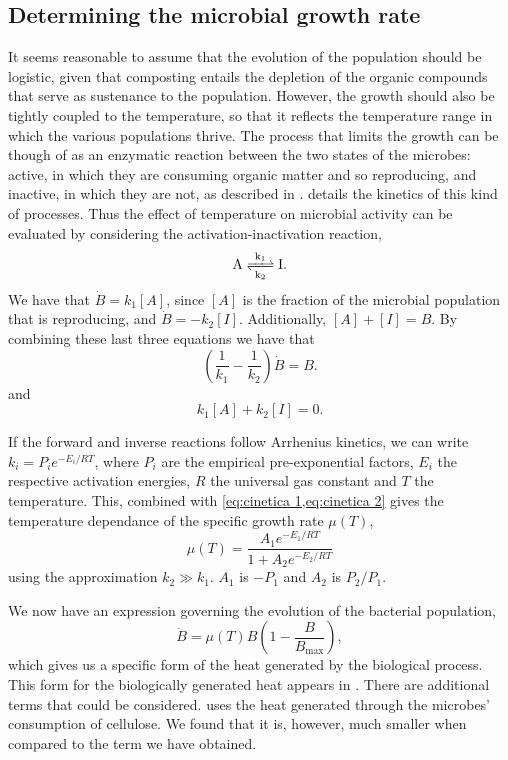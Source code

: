 \documentclass[12pt, a4paper, twocolumn, twoside]{article}
\numberwithin{table}{section}
\numberwithin{figure}{section}
\numberwithin{equation}{section}
\begin{document}
\subsection{Determining the microbial growth rate}
It seems reasonable to assume that the evolution of the population should be logistic, given that composting entails the depletion of the organic compounds that serve as sustenance to the population. However, the growth should also be tightly coupled to the temperature, so that it reflects the temperature range in which the various populations thrive. The process that limits the growth can be though of as an enzymatic reaction between the two states of the microbes: active, in which they are consuming organic matter and so reproducing, and inactive, in which they are not, as described in \cite{85bio}. \cite{biokinetics} details the kinetics of this kind of processes. Thus the effect of temperature on microbial activity can be evaluated by considering the activation-inactivation reaction,
\begin{equation*}
    \ce{A <=>[\ce{k1}][\ce{k2}] I}. 
\end{equation*}
We have that $\dot{B}=k_1[A]$, since \( [A] \) is the fraction of the microbial population that is reproducing, and $\dot{B}= -k_2[I]$. Additionally, \( [A] + [I] = B \).  By combining these last three equations we have that
\begin{equation} \label{eq:cinetica 1}
	\left(\frac{1}{k_1}-\frac{1}{k_2}\right)\dot{B}=B.
\end{equation}
and 
\begin{equation} \label{eq:cinetica 2}
	k_1[A]+k_2[I]=0.
\end{equation}

If the forward and inverse reactions follow Arrhenius kinetics, we can write $k_i=P_ie^{-E_i/RT}$, where $P_i$ are the empirical pre-exponential factors, $E_i$ the respective activation energies, $R$ the universal gas constant and $T$ the temperature. This, combined with \cref{eq:cinetica 1,eq:cinetica 2} gives the temperature dependance of the specific growth rate \( \mu(T) \), 
\begin{equation} \label{eq:mumax}
    \mu(T)=\frac{A_1e^{-E_1/RT}}{1+A_2e^{-E_2/RT}}
\end{equation}
using the approximation $k_2\gg k_1$. \( A_1 \) is \( -P_1 \) and \( A_2 \) is \( P_2/P_1 \).

We now have an expression governing the evolution of the bacterial population,
\begin{equation}\label{eq:edo B}
	\dot{B} = \mu(T)B\left(1 - \frac{B}{B_\text{max}}\right),
\end{equation}
which gives us a specific form of the heat generated by the biological process. This form for the biologically generated heat appears in \cite{semenov}. There are additional terms that could be considered. \cite{semenov} uses the heat generated through the microbes' consumption of cellulose. We found that it is, however, much smaller when compared to the term we have obtained.  
\end{document}
